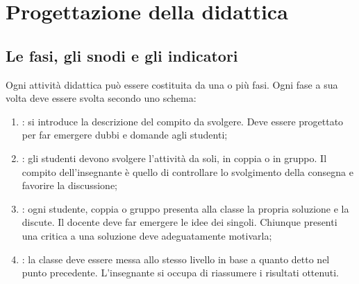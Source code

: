 \chapter{Progettazione della didattica}

\section{Le fasi, gli snodi e gli indicatori}

Ogni attività didattica può essere costituita da una o più fasi. Ogni fase a sua volta deve essere svolta secondo uno schema:

\begin{enumerate}
    \item {}: si introduce la descrizione del compito da svolgere. Deve essere progettato per far emergere dubbi e domande agli studenti;
    \item {}: gli studenti devono svolgere l'attività da soli, in coppia o in gruppo. Il compito dell'insegnante è quello di controllare lo svolgimento della consegna e favorire la discussione;
    \item {}: ogni studente, coppia o gruppo presenta alla classe la propria soluzione e la discute. Il docente deve far emergere le idee dei singoli. Chiunque presenti una critica a una soluzione deve adeguatamente motivarla;
    \item {}: la classe deve essere messa allo stesso livello in base a quanto detto nel punto precedente. L'insegnante si occupa di riassumere i risultati ottenuti.
\end{enumerate}





